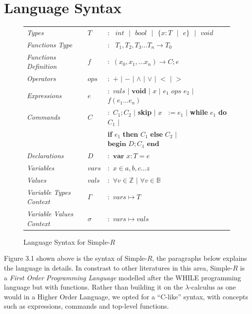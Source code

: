 \documentclass[a4paper,12pt]{report}
\begin{document}
\section{Language Syntax}
\begin{figure}[H]
  \begin{center}
    \begin{tabular}{l l l}
      \textit{Types} & $T$ & $:\text{ }int\text{ }|\text{ }bool\text{ }|
      \text{ }\{x: T\text{ }|\text{ }e\}\text{ }|\text{ }void$\\
      \textit{Functions Type} &  & $:\text{ }T_1, T_2,T_3...T_n\longrightarrow T_0$\\
      \textit{Functions Definition} & $f$ & $:$ $(x_0,x_1,...x_n) \longrightarrow C;e$\\
      \textit{Operators} & $ops$ & $:$ $+$ $|$ $-$ $|$ $\wedge$ $|$ $\vee$ $|$ $<$ $|$ $>$ \\
      \textit{Expressions} & $e$ & $:$ $vals$ $|$ $\textbf{void}$ $|$ $x$ $|$ $e_1$ $ops$ $e_2$ 
      $|$ $f(e_1...e_n)$ \\
      \textit{Commands} & $C$ & $:$ $C_1;C_2$ $|$ \textbf{skip} $|$ $x\text{ }:= e_1$ 
      $|$ \textbf{while} $e_1$ \textbf{do} $C_1$ $|$ \\ 
        & & \; \textbf{if} $e_1$ \textbf{then} $C_1$ \textbf{else} $C_2$ $|$ 
        $\textbf{begin } D;C_1\textbf{ end}$ \\
      \textit{Declarations} & $D$ & $:$ $\textbf{var } x : T = e$ \\
      \textit{Variables} & $vars$& $:$ $x \in {a,b,c...z}$\\
      \textit{Values} & $vals$& $:$ $\forall v \in \mathbb{Z}$ $|$ $\forall v \in \mathbb{B}$\\
      \textit{Variable Types Context} & $\Gamma$& $:$ $vars \mapsto T$\\
      \textit{Variable Values Context} & $\sigma$& $:$ $vars \mapsto vals$
    \end{tabular}
  \end{center}
  \caption{Language Syntax for Simple-$R$}
\end{figure}

\par
Figure 3.1 shown above is the syntax of Simple-$R$, the paragraphs below 
explains the language in details. In constrast to other literatures in this area, 
Simple-$R$ is a \textit{First Order Programming Language} \cite{FOL} modelled 
after the WHILE \cite{whileLanguage} programming language but with functions.
Rather than building it on the $\lambda$-calculus as one would in 
a Higher Order Language, we opted for a ``C-like'' syntax, with concepts such as 
expressions, commands and top-level functions.
\end{document}
